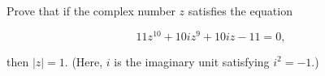 \begin{problem}
    Prove that if the complex number \( z \) satisfies the equation

    \[
        11z^{10} + 10i z^9 + 10i z -11 = 0,
    \]

    then \( |z| = 1 \). (Here, \( i \) is the imaginary unit satisfying \( i^2 = -1 \).)
\end{problem}
